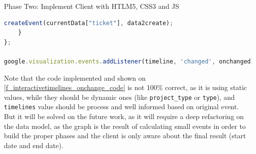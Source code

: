 \begin{part}{Phase Two: Implement Client with HTLM5, CSS3 and JS}
\begin{lstlisting}[language=Javascript,breaklines=true,caption=CHAP On\
change\ event,label=f_interactivetimelines_onchange_code]
        createEvent(currentData["ticket"], data2create);
    }
};

google.visualization.events.addListener(timeline, 'changed', onchanged);
\end{lstlisting} 

Note that the code implemented and shown on \ref{f_interactivetimelines_onchange_code} is not 100\% correct, as
it is using static values, while they should be dynamic ones (like \texttt{project\_type} or
\texttt{type}), and \texttt{timelines} value should be process and well informed
based on original event. But it will be solved on the future work, as it will
require a deep refactoring on the data model, as the graph is the result of
calculating small events in order to build the proper phases and the client is
only aware about the final result (start date and end date).


% 

\end{part}